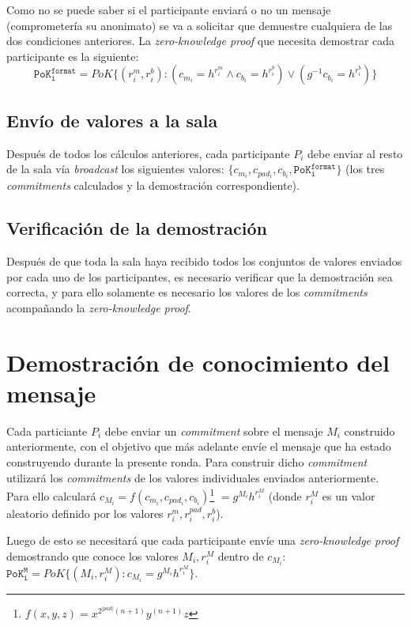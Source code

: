 Como no se puede saber si el participante enviará o no un mensaje 
(comprometería su anonimato) se va a solicitar que demuestre cualquiera de las 
dos condiciones anteriores. La \emph{zero-knowledge proof} que necesita demostrar 
cada participante es la siguiente: 
$$\mathtt{PoK_i^{format}} = PoK\{(r_i^m, r_i^b) : (c_{m_i} = h^{r_i^m} \land c_{b_i} = h^{r_i^b}) \lor (g^{-1} c_{b_i} = h^{r_i^b})\}$$

\subsection{Envío de valores a la sala}

Después de todos los cálculos anteriores, cada participante $P_i$ debe enviar 
al resto de la sala vía \emph{broadcast} los siguientes valores: 
$\{c_{m_i}, c_{pad_i}, c_{b_i}, \mathtt{PoK_i^{format}}\}$ (los tres \emph{commitments} 
calculados y la demostración correspondiente).

\subsection{Verificación de la demostración}

Después de que toda la sala haya recibido todos los conjuntos de valores enviados 
por cada uno de los participantes, es necesario verificar que la demostración sea 
correcta, y para ello solamente es necesario los valores de los \emph{commitments} 
acompañando la \emph{zero-knowledge proof}.

\section{Demostración de conocimiento del mensaje}

Cada particiante $P_i$ debe enviar un \emph{commitment} sobre el mensaje $M_i$ 
construido anteriormente, con el objetivo que más adelante envíe el mensaje que 
ha estado construyendo durante la presente ronda. Para construir dicho \emph{commitment} 
utilizará los \emph{commitments} de los valores individuales enviados anteriormente. 
Para ello calculará 
$c_{M_i} = f(c_{m_i}, c_{pad_i}, c_{b_i})$\footnote{$f(x, y, z) = x^{2^{|pad|}(n+1)} y^{(n+1)} z$} 
$= g^{M_i} h^{r_i^{M}}$ (donde $r_i^{M}$ es un valor aleatorio definido por los 
valores $r_i^m, r_i^{pad}, r_i^b$). 

Luego de esto se necesitará que cada participante envíe una \emph{zero-knowledge proof} 
demostrando que conoce los valores $M_i, r_i^M$ dentro de $c_{M_i}$: 
$\mathtt{PoK_i^M} = PoK\{(M_i, r_i^M) : c_{M_i} = g^{M_i} h^{r_i^M}\}$.


